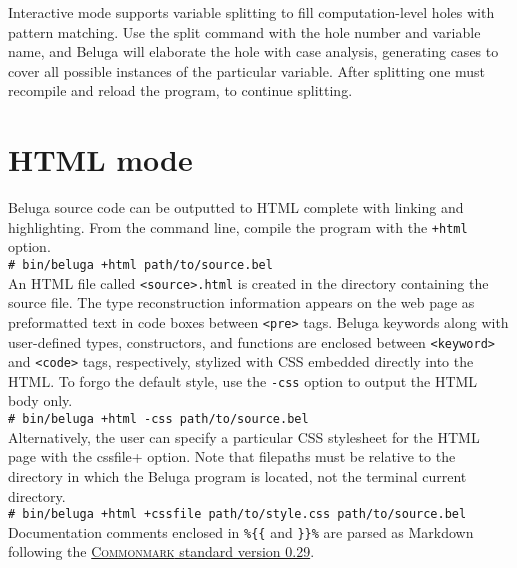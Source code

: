 \documentclass[11pt]{article}
\newcommand{\shellcmd}[1]{\\\indent\texttt{\# #1}\\}
\begin{document}
Interactive mode supports variable splitting to fill computation-level holes with pattern matching.
Use the split command with the hole number and variable name, and Beluga will elaborate the hole with case analysis, generating cases to cover all possible instances of the particular variable.
After splitting one must recompile and reload the program, to continue splitting.

\section{HTML mode}

Beluga source code can be outputted to HTML complete with linking and highlighting.
From the command line, compile the program with the \texttt{+html} option.
\shellcmd{bin/beluga +html path/to/source.bel}
An HTML file called \verb+<source>.html+ is created in the directory containing the source file.
The type reconstruction information appears on the web page as preformatted text in code boxes between \verb+<pre>+ tags.
Beluga keywords along with user-defined types, constructors, and functions are enclosed between \verb+<keyword>+ and \verb+<code>+ tags, respectively, stylized with CSS embedded directly into the HTML.
To forgo the default style, use the \verb+-css+ option to output the HTML body only.
\shellcmd{bin/beluga +html -css path/to/source.bel}
Alternatively, the user can specify a particular CSS stylesheet for the HTML page with the \verb++cssfile+ option.
Note that filepaths must be relative to the directory in which the Beluga program is located, not the terminal current directory.
\shellcmd{bin/beluga +html +cssfile path/to/style.css path/to/source.bel}

Documentation comments enclosed in \verb+%{{+ and \verb+}}%+ are parsed as Markdown following the \href{https://spec.commonmark.org/0.29}{\textsc{Commonmark} standard version 0.29}.
\end{document}
